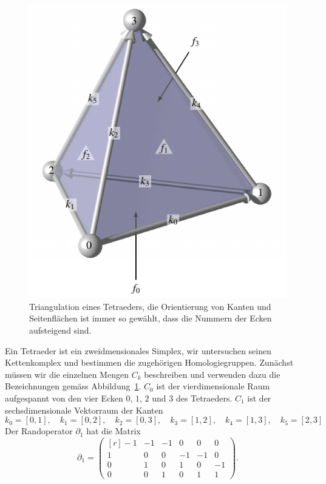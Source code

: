 \begin{beispiel}
\begin{figure}
\centering
\includegraphics{chapters/95-homologie/images/tetraeder.pdf}
\caption{Triangulation eines Tetraeders, die Orientierung von Kanten
und Seitenflächen ist immer so gewählt, dass die Nummern der Ecken
aufsteigend sind.
\label{buch:homologie:tetraeder:fig}}
\end{figure}
Ein Tetraeder ist ein zweidmensionales Simplex, wir untersuchen seinen
Kettenkomplex und bestimmen die zugehörigen Homologiegruppen.
Zunächst müssen wir die einzelnen Mengen $C_k$ beschreiben und verwenden
dazu die Bezeichnungen gemäss Abbildung~\ref{buch:homologie:tetraeder:fig}.
$C_0$ ist der vierdimensionale Raum aufgespannt von den vier Ecken 
$0$, $1$, $2$ und $3$ des Tetraeders.
$C_1$ ist der sechsdimensionale Vektorraum der Kanten 
\[
k_0 = [0,1],\quad
k_1 = [0,2],\quad
k_2 = [0,3],\quad
k_3 = [1,2],\quad
k_4 = [1,3],\quad
k_5 = [2,3]
\]
Der Randoperator $\partial_1$ hat die Matrix
\[
\partial_1
=
\begin{pmatrix*}[r]
-1&-1&-1& 0& 0& 0\\
 1& 0& 0&-1&-1& 0\\
 0& 1& 0& 1& 0&-1\\
 0& 0& 1& 0& 1& 1
\end{pmatrix*}.
\]


\end{beispiel}
